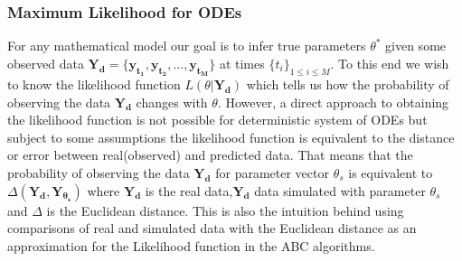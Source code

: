 \documentclass[12pt,a4paper,titlepage]{article}
\begin{document}
\subsubsection{Maximum Likelihood for ODEs}
For any mathematical model our goal is to infer true parameters $\theta^*$ given some observed data $\mathbf{Y_{d}} =\{\mathbf{y_{t_1}}, \mathbf{y_{t_2}}, \dots, \mathbf{y_{t_M}}\}$ at times $\{t_{i}\}_{1 \le i \le M}$. To this end we wish to know the likelihood function $L(\theta | \mathbf{Y_{d}})$ which tells us how the probability of observing the data $\mathbf{Y_{d}}$ changes with $\theta$. However, a direct approach to obtaining the likelihood function is not possible for deterministic system of ODEs but subject to some assumptions the likelihood function is equivalent to the distance or error between real(observed) and predicted data. That means that the probability of observing the data $\mathbf{Y_{d}}$ for parameter vector $\theta_{s}$ is equivalent to $\Delta(\mathbf{Y_{d}}, \mathbf{Y_{\theta_s}})$ where $\mathbf{Y_{d}}$ is the real data,$\mathbf{Y_{d}}$ data simulated with parameter $\theta_{s}$ and $\Delta$ is the Euclidean distance. This is also the intuition behind using comparisons of real and simulated data with the Euclidean distance as an approximation for the Likelihood function in the ABC algorithms. 
\end{document}
